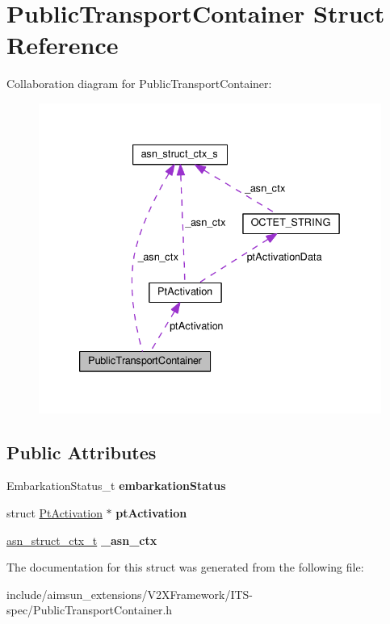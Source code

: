 \hypertarget{structPublicTransportContainer}{}\section{Public\+Transport\+Container Struct Reference}
\label{structPublicTransportContainer}


Collaboration diagram for Public\+Transport\+Container\+:\nopagebreak
\begin{figure}[H]
\begin{center}
\leavevmode
\includegraphics[width=333pt]{structPublicTransportContainer__coll__graph}
\end{center}
\end{figure}
\subsection*{Public Attributes}
\begin{DoxyCompactItemize}
\item 
Embarkation\+Status\+\_\+t {\bfseries embarkation\+Status}\hypertarget{structPublicTransportContainer_a3662a9ee5aa1d6f813d0b0faae177053}{}\label{structPublicTransportContainer_a3662a9ee5aa1d6f813d0b0faae177053}

\item 
struct \hyperlink{structPtActivation}{Pt\+Activation} $\ast$ {\bfseries pt\+Activation}\hypertarget{structPublicTransportContainer_a7dfcf3cf39ca9a89b79c12b877e82d15}{}\label{structPublicTransportContainer_a7dfcf3cf39ca9a89b79c12b877e82d15}

\item 
\hyperlink{structasn__struct__ctx__s}{asn\+\_\+struct\+\_\+ctx\+\_\+t} {\bfseries \+\_\+asn\+\_\+ctx}\hypertarget{structPublicTransportContainer_a71a619d16bc4b670a44b6751a6582b4b}{}\label{structPublicTransportContainer_a71a619d16bc4b670a44b6751a6582b4b}

\end{DoxyCompactItemize}


The documentation for this struct was generated from the following file\+:\begin{DoxyCompactItemize}
\item 
include/aimsun\+\_\+extensions/\+V2\+X\+Framework/\+I\+T\+S-\/spec/Public\+Transport\+Container.\+h\end{DoxyCompactItemize}

